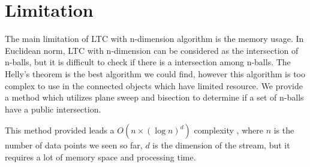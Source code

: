 






\section{Limitation}


The main limitation of LTC with n-dimension algorithm is the memory usage. In
Euclidean norm, LTC with n-dimension can be considered as the intersection of
n-balls, but it is difficult to check if there is a intersection among n-balls.
The Helly's theorem is the best algorithm we could find, however this algorithm
is too complex to use in the connected objects which have limited resource.  We
provide a method which utilizes plane sweep and bisection to determine if a set
of n-balls have a public intersection.

This method provided leads a $O(n\times (\log{n})^d)$ complexity , where $n$ is
the number of data points we seen so far, $d$ is the dimension of the stream,
but it requires a lot of memory space and processing time. 

